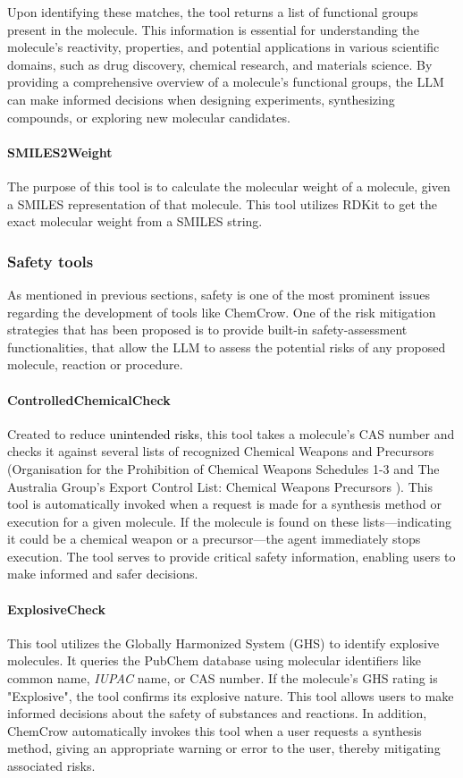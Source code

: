 \documentclass[10pt]{article}
\newcommand{\blue}[1]{\textcolor{black}{#1}}
\begin{document}
Upon identifying these matches, the tool returns a list of functional groups present in the molecule. This information is essential for understanding the molecule's reactivity, properties, and potential applications in various scientific domains, such as drug discovery, chemical research, and materials science. By providing a comprehensive overview of a molecule's functional groups, the LLM can make informed decisions when designing experiments, synthesizing compounds, or exploring new molecular candidates.

\paragraph{SMILES2Weight} 
The purpose of this tool is to calculate the molecular weight of a molecule, given a SMILES representation of that molecule. This tool utilizes RDKit \cite{rdkit} to get the exact molecular weight from a SMILES string. 


\subsubsection{Safety tools}
As mentioned in previous sections, safety is one of the most prominent issues regarding the development of tools like ChemCrow. One of the risk mitigation strategies that has been proposed is to provide built-in safety-assessment functionalities, that allow the LLM to assess the potential risks of any proposed molecule, reaction or procedure. 

\paragraph{ControlledChemicalCheck}
Created to reduce \blue{unintended risks}, this tool takes a molecule's CAS number and checks it against several lists of recognized Chemical Weapons and Precursors (Organisation for the Prohibition of Chemical Weapons Schedules 1-3 \cite{ChemicalWeaponsConvention2023} and The Australia Group's Export Control List: Chemical Weapons Precursors \cite{AustraliaGroup2023}). This tool is automatically invoked when a request is made for a synthesis method or execution for a given molecule. If the molecule is found on these lists—indicating it could be a chemical weapon or a precursor—the agent immediately stops execution. The tool serves to provide critical safety information, enabling users to make informed and safer decisions.

\paragraph{ExplosiveCheck}
This tool utilizes the Globally Harmonized System (GHS) to identify explosive molecules. It queries the PubChem database using molecular identifiers like common name, \textit{IUPAC} name, or CAS number. If the molecule's GHS rating is "Explosive", the tool confirms its explosive nature. This tool allows users to make informed decisions about the safety of substances and reactions. In addition, ChemCrow automatically invokes this tool when a user requests a synthesis method, giving an appropriate warning or error to the user, thereby mitigating associated risks.
\end{document}
